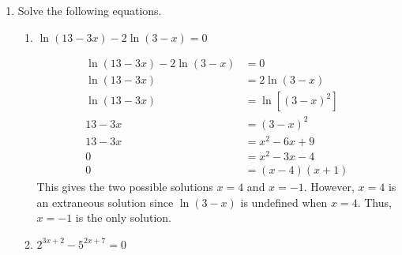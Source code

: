\documentclass{article}
\begin{document}
\begin{enumerate}
\begin{enumerate}
  \item
    \begin{problem}[\vfill]
      According to the exponential model, how quickly is the number of views changing at 12:20 pm?
    \end{problem}

    \begin{solution}
      We want to find $E'(20)$, so we should first find $E'(t)$. We can 
      start by rewriting $E(t)$ as 
      $E(t) = 1200\left[(\tfrac{7}{6})^{1/10}\right]^t$, so
      \begin{align*}
        E'(t) &= 1200 \ln\!\left((\tfrac{7}{6})^{1/10}\right) 
        \left[(\tfrac{7}{6})^{1/10}\right]^t \\
        & =120\ln(\tfrac{7}{6})(\tfrac{7}{6})^{t/10}
      \end{align*}
      This means that
      $E'(20) = 120\ln(\tfrac{7}{6})(\tfrac{7}{6})^2$.
    \end{solution}

  \end{enumerate}

\item  Solve the following equations.

  \begin{enumerate}
  \item

    \begin{problem}[\vfill]
      $\ln(13 - 3x) - 2 \ln(3 - x) = 0$
    \end{problem}

    \begin{solution}
      \begin{align*}
        \ln(13 - 3x) - 2 \ln(3 - x) &= 0 \\
        \ln(13 - 3x) &= 2\ln(3-x) \\
        \ln(13-3x) &= \ln\!\left[(3-x)^2\right] \\
        13-3x &= (3-x)^2 \\
        13 - 3x &= x^2 - 6x + 9 \\
        0 &= x^2 - 3x - 4 \\
        0 &= (x-4)(x+1)
      \end{align*}
      This gives the two possible solutions $x=4$ and $x=-1$. However,
      $x=4$ is an extraneous solution since $\ln(3-x)$ is undefined
      when $x=4$. Thus, $x=-1$ is the only solution.
    \end{solution}

  \item
    \begin{problem}[\vfill]
      $2^{3x + 2} - 5^{2x + 7} = 0$
    \end{problem}


\end{enumerate}
\end{enumerate}
\end{document}
